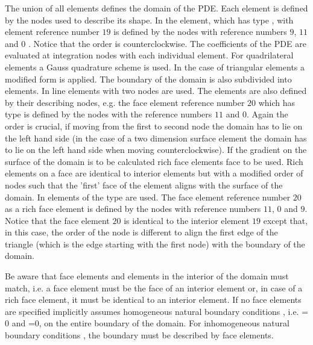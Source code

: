 The union of all elements defines the domain of the PDE.
Each element is defined by the nodes used to describe its shape. In  the element,
which has type ,
with element reference number $19$  is defined by the nodes
with reference numbers $9$, $11$ and $0$ . Notice that the order is counterclockwise.
The coefficients of the PDE are evaluated at integration nodes with each individual element.
For quadrilateral elements a Gauss quadrature scheme is used. In the case of triangular elements a
modified form is applied. The boundary of the domain is also subdivided into elements.  In 
line elements with two nodes are used. The elements are also defined by their describing nodes, e.g.
the face element reference number $20$ which has type  is defined by the nodes
with the reference numbers $11$ and $0$. Again the order is crucial, if moving from the first
to second node the domain has to lie on the left hand side (in the case of a two dimension surface element
the domain has to lie on the left hand side when moving counterclockwise). If the gradient on the
surface of the domain is to be calculated rich face elements face to be used. Rich elements on a face
are identical to interior elements but with a modified order of nodes such that the 'first' face of the element aligns
with the surface of the domain. In 
elements of the type  are used.
The face element reference number $20$ as a rich face element is defined by the nodes
with reference numbers $11$, $0$ and $9$. Notice that the face element $20$ is identical to the
interior element $19$ except that, in this case, the order of the node is different to align the first
edge of the triangle (which is the edge starting with the first node) with the boundary of the domain.

Be aware that face elements and elements in the interior of the domain must match, i.e. a face element must be the face
of an interior element or, in case of a rich face element, it must be identical to an interior element.
If no face elements are specified
\finley implicitly assumes homogeneous natural boundary conditions ,
i.e. =$0$ and =$0$, on the entire boundary of the domain. For
inhomogeneous natural boundary conditions ,
the boundary must be described by face elements.

